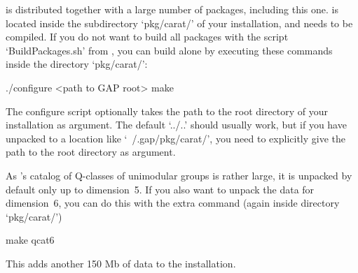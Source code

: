 
{\GAP} is distributed together with a large number of packages, including
this one. {\Carat} is located inside the subdirectory `pkg/carat/' of your 
{\GAP} installation, and needs to be compiled. If you do not want to build 
all packages with the script `BuildPackages.sh' from {\GAP}, you can build 
{\Carat} alone by executing these commands inside the directory `pkg/carat/':

\begintt
./configure <path to GAP root>
make
\endtt

The configure script optionally takes the path to the root directory of 
your {\GAP} installation as argument. The default `../..' should usually 
work, but if you have unpacked {\Carat} to a location like `~/.gap/pkg/carat/', 
you need to explicitly give the path to the {\GAP} root directory as argument.

As {\CARAT}'s catalog of Q-classes of unimodular groups is rather large,
it is unpacked by default only up to dimension~5. If you also want
to unpack the data for dimension~6, you can do this with the extra
command (again inside directory `pkg/carat/')

\begintt
make qcat6
\endtt

This adds another 150 Mb of data to the installation.
